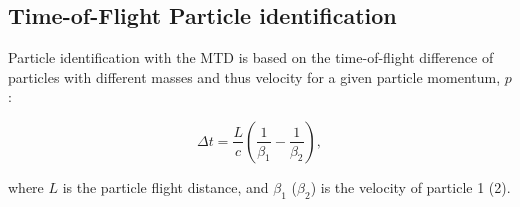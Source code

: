 \subsection{Time-of-Flight Particle identification}

Particle identification with the MTD is based on the time-of-flight 
difference of particles with different masses and thus velocity for 
a given particle momentum, $p$:

\begin{equation}
\label{eq:tof}
\Delta t = \frac{L}{c}\left( \frac{1}{\beta_{1}} - \frac{1}{\beta_{2}}\right),
\end{equation}

\noindent where $L$ is the particle flight distance, and $\beta_1$ ($\beta_2$) 
is the velocity of particle 1 (2). 



